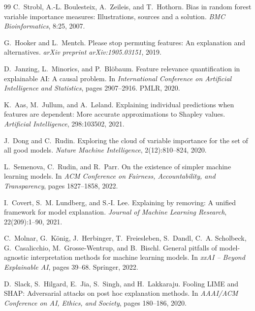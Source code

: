 \documentclass[11pt]{article}
\begin{document}
\begin{thebibliography}{99}
C.~Strobl, A.-L. Boulesteix, A.~Zeileis, and T.~Hothorn.
\newblock Bias in random forest variable importance measures: Illustrations,
  sources and a solution.
\newblock \emph{BMC Bioinformatics}, 8:25, 2007.

G.~Hooker and L.~Mentch.
\newblock Please stop permuting features: An explanation and alternatives.
\newblock \emph{arXiv preprint arXiv:1905.03151}, 2019.

D.~Janzing, L.~Minorics, and P.~Bl{\"o}baum.
\newblock Feature relevance quantification in explainable {AI}: A causal
  problem.
\newblock In \emph{International Conference on Artificial Intelligence and
  Statistics}, pages 2907--2916. PMLR, 2020.

K.~Aas, M.~Jullum, and A.~L{\o}land.
\newblock Explaining individual predictions when features are dependent:
  More accurate approximations to {S}hapley values.
\newblock \emph{Artificial Intelligence}, 298:103502, 2021.

J.~Dong and C.~Rudin.
\newblock Exploring the cloud of variable importance for the set of all good
  models.
\newblock \emph{Nature Machine Intelligence}, 2(12):810--824, 2020.

L.~Semenova, C.~Rudin, and R.~Parr.
\newblock On the existence of simpler machine learning models.
\newblock In \emph{ACM Conference on Fairness, Accountability, and
  Transparency}, pages 1827--1858, 2022.

I.~Covert, S.~M. Lundberg, and S.-I. Lee.
\newblock Explaining by removing: A unified framework for model explanation.
\newblock \emph{Journal of Machine Learning Research}, 22(209):1--90, 2021.

C.~Molnar, G.~K{\"o}nig, J.~Herbinger, T.~Freiesleben, S.~Dandl,
  C.~A. Scholbeck, G.~Casalicchio, M.~Grosse-Wentrup, and B.~Bischl.
\newblock General pitfalls of model-agnostic interpretation methods for
  machine learning models.
\newblock In \emph{xxAI -- Beyond Explainable AI}, pages 39--68. Springer,
  2022.

D.~Slack, S.~Hilgard, E.~Jia, S.~Singh, and H.~Lakkaraju.
\newblock Fooling {LIME} and {SHAP}: Adversarial attacks on post hoc
  explanation methods.
\newblock In \emph{AAAI/ACM Conference on AI, Ethics, and Society}, pages
  180--186, 2020.

\end{thebibliography}
\end{document}
